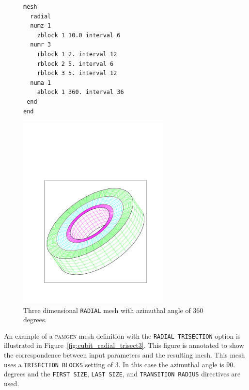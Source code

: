 \begin{figure}[htbp]
\centering
  \begin{minipage}[c]{0.4\linewidth}
    \centering
{\ttfamily \begin{verbatim}
mesh
  radial
  numz 1
    zblock 1 10.0 interval 6
  numr 3
    rblock 1 2. interval 12
    rblock 2 5. interval 6
    rblock 3 5. interval 12
  numa 1
    ablock 1 360. interval 36
 end
end
\end{verbatim}}
  \end{minipage}%
  \hfil
  \begin{minipage}[c]{0.6\linewidth}
    \centering
      \includegraphics[width=3.0in]{figures/cubit_radial2}
  \end{minipage}
  \caption [A 360 degree \texttt{RADIAL} mesh.]{Three dimensional \texttt{RADIAL} mesh with azimuthal
    angle of 360 degrees.}
  \label{fig:rect_cubit_radial2}
\end{figure}

An example of a \textsc{pamgen} mesh definition with the
\texttt{RADIAL TRISECTION} option is illustrated in
Figure~\ref{fig:cubit_radial_trisect3}. This figure is annotated to
show the correspondence between input parameters and the
resulting mesh. This mesh uses a \texttt{TRISECTION BLOCKS} setting of 3. In this case the azimuthal
angle is 90. degrees and the \texttt{FIRST SIZE}, \texttt{LAST SIZE},
 and \texttt{TRANSITION RADIUS} directives are used.

